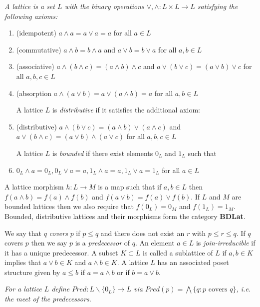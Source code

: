 \begin{defn}
{\em
A {\em lattice} is a set $L$ with the binary operations $\vee,\wedge:L\times L\to L$ satisfying the following axioms:

\begin{enumerate}
\item (idempotent) $a\wedge a = a \vee a = a$ for all $a\in L$
\item (commutative) $a\wedge b = b\wedge a$ and $a\vee b = b \vee a$ for all $a,b\in L$
\item (associative) $a\wedge (b\wedge c) = (a\wedge b)\wedge c$ and $a\vee(b\vee c) = (a\vee b)\vee c$ for all $a,b,c\in L$
\item (absorption $a\wedge (a\vee b) = a\vee (a\wedge b)=a$ for all $a,b\in L$

A lattice $L$ is {\em distributive} if it satisfies the additional axiom:

\item (distributive) $a\wedge (b\vee c) = (a\wedge b)\vee (a\wedge c)$ and $a\vee (b\wedge c) = (a\vee b) \wedge (a\vee c)$ for all $a,b,c\in L$

A lattice $L$ is {\em bounded} if there exist elements $0_L$ and $1_L$ such that

\item $0_L\wedge a = 0_L, 0_L\vee a = a, 1_L\wedge a = a, 1_L\vee a = 1_L$ for all $a\in L$
\end{enumerate}
}
\end{defn}

A lattice morphism $h:L\to M$ is a map such that if $a,b\in L$ then $f(a\wedge b) = f(a)\wedge f(b)$ and $f(a\vee b) = f(a)\vee f(b)$.  If $L$ and $M$ are bounded lattices then we also require that $f(0_L)=0_M$ and $f(1_L)=1_M$.    Bounded, distributive lattices and their morphisms form the category {\bf BDLat}.

We say that $q$ {\em covers} $p$ if $p\leq q$ and there does not exist an $r$ with $p\leq r \leq q$.  If $q$ covers $p$ then we say $p$ is a {\em predecessor} of $q$.  An element $a\in L$ is {\em join-irreducible} if it has a unique predecessor.   A subset $K\subset L$ is called a sublattice of $L$ if $a,b\in K$ implies that $a\vee b\in K$ and $a\wedge b\in K$.  A lattice $L$ has an associated poset structure given by $a\leq b$ if $a=a\wedge b$ or if $b=a\vee b$.

\begin{defn}
{\em
For a lattice $L$ define $Pred:L\backslash \{0_L\} \to L$ via $Pred(p) = \bigwedge \{q: \text{$p$ covers $q$}\}$, i.e. the meet of the predecessors.
}
\end{defn}

